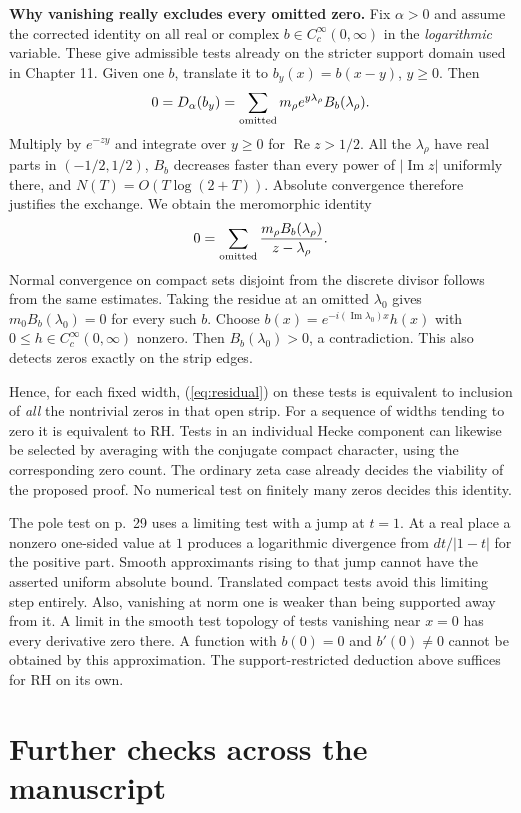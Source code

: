 \documentclass[11pt,letterpaper]{article}
\newcommand{\re}{\operatorname{Re}}
\newcommand{\im}{\operatorname{Im}}
\newcommand{\head}[1]{\par\smallskip\textbf{#1}\enspace}
\begin{document}
\head{Why vanishing really excludes every omitted zero.}
Fix $\alpha>0$ and assume the corrected identity on all real or complex $b\in C_c^\infty(0,\infty)$ in the \emph{logarithmic} variable. These give admissible tests already on the stricter support domain used in Chapter 11. Given one $b$, translate it to $b_y(x)=b(x-y)$, $y\ge0$. Then
\[
 0=D_\alpha(b_y)=\sum_{\rm omitted}m_\rho e^{y\lambda_\rho}B_b(\lambda_\rho).
\]
Multiply by $e^{-zy}$ and integrate over $y\ge0$ for $\re z>1/2$. All the $\lambda_\rho$ have real parts in $(-1/2,1/2)$, $B_b$ decreases faster than every power of $|\im z|$ uniformly there, and $N(T)=O(T\log(2+T))$. Absolute convergence therefore justifies the exchange. We obtain the meromorphic identity
\[
 0=\sum_{\rm omitted}\frac{m_\rho B_b(\lambda_\rho)}{z-\lambda_\rho}.
\]
Normal convergence on compact sets disjoint from the discrete divisor follows from the same estimates. Taking the residue at an omitted $\lambda_0$ gives $m_0B_b(\lambda_0)=0$ for every such $b$. Choose $b(x)=e^{-i(\im\lambda_0)x}h(x)$ with $0\le h\in C_c^\infty(0,\infty)$ nonzero. Then $B_b(\lambda_0)>0$, a contradiction. This also detects zeros exactly on the strip edges.

Hence, for each fixed width, (\ref{eq:residual}) on these tests is equivalent to inclusion of \emph{all} the nontrivial zeros in that open strip. For a sequence of widths tending to zero it is equivalent to RH. Tests in an individual Hecke component can likewise be selected by averaging with the conjugate compact character, using the corresponding zero count. The ordinary zeta case already decides the viability of the proposed proof. No numerical test on finitely many zeros decides this identity.

The pole test on p.~29 uses a limiting test with a jump at $t=1$. At a real place a nonzero one-sided value at $1$ produces a logarithmic divergence from $dt/|1-t|$ for the positive part. Smooth approximants rising to that jump cannot have the asserted uniform absolute bound. Translated compact tests avoid this limiting step entirely. Also, vanishing at norm one is weaker than being supported away from it. A limit in the smooth test topology of tests vanishing near $x=0$ has every derivative zero there. A function with $b(0)=0$ and $b'(0)\ne0$ cannot be obtained by this approximation. The support-restricted deduction above suffices for RH on its own.

\section{Further checks across the manuscript}\label{sec:chapters}
\end{document}
